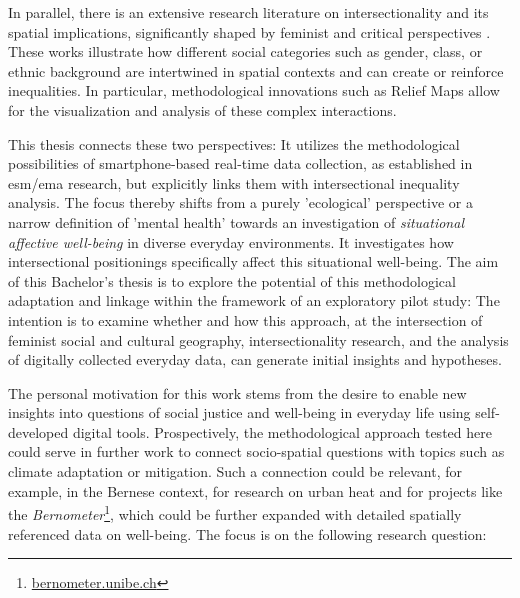 In parallel, there is an extensive research literature on intersectionality and its spatial implications, significantly shaped by feminist and critical perspectives \parencite[cf.][]{crenshawMappingMarginsIntersectionality1991, rodo-de-zarateDevelopingGeographiesIntersectionality2014, rodo-de-zarateYoungLesbiansNegotiating2015, rodo-de-zarateIntersectionalityFeministGeographies2018}. These works illustrate how different social categories such as gender, class, or ethnic background are intertwined in spatial contexts and can create or reinforce inequalities. In particular, methodological innovations such as Relief Maps \parencite{rodo-de-zarateDevelopingGeographiesIntersectionality2014} allow for the visualization and analysis of these complex interactions.

This thesis connects these two perspectives: It utilizes the methodological possibilities of smartphone-based real-time data collection, as established in \gls{esm}/\gls{ema} research, but explicitly links them with intersectional inequality analysis. The focus thereby shifts from a purely 'ecological' perspective or a narrow definition of 'mental health' towards an investigation of \emph{situational affective well-being} in diverse everyday environments. It investigates how intersectional positionings specifically affect this situational well-being. The aim of this Bachelor's thesis is to explore the potential of this methodological adaptation and linkage within the framework of an exploratory pilot study: The intention is to examine whether and how this approach, at the intersection of feminist social and cultural geography, intersectionality research, and the analysis of digitally collected everyday data, can generate initial insights and hypotheses.

The personal motivation for this work stems from the desire to enable new insights into questions of social justice and well-being in everyday life using self-developed digital tools. Prospectively, the methodological approach tested here could serve in further work to connect socio-spatial questions with topics such as climate adaptation or mitigation. Such a connection could be relevant, for example, in the Bernese context, for research on urban heat \parencite[cf.][]{burgerModellingSpatialPattern2021} and for projects like the \emph{Bernometer}\footnote{\href{[https://bernometer.unibe.ch/bernometer/](https://bernometer.unibe.ch/bernometer/)}{bernometer.unibe.ch}}, which could be further expanded with detailed spatially referenced data on well-being. The focus is on the following research question:

